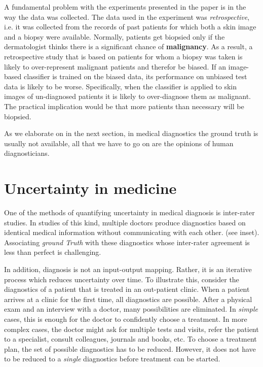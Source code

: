 \documentclass[11pt]{pnas-new}
\begin{document}
A fundamental problem with the experiments presented in the paper is in the way the data was
collected. The data used in the experiment was {\em retrospective},
i.e. it was collected from the records of past patients for which both
a skin image and a biopsy were available. Normally, patients get
biopsied only if the dermatologist thinks there is a significant
chance of {\bf malignancy}. As a result, a retrospective study that is
based on patients for whom a biopsy was taken is likely to
over-represent malignant patients and therefor be biased. If an image-based classifier
is trained on the biased data, its performance on unbiased test data
is likely to be worse. Specifically, when the classifier is applied to skin
images of un-diagnosed patients it is likely to over-diagnose them as
malignant. The practical implication would be that more patients than
necessary will be biopsied. 

As we elaborate on in the next section, in medical diagnostics the
ground truth is usually not available, all that we have to go on are
the opinions of human diagnosticians.

\section{Uncertainty in medicine}


One of the methods of quantifying uncertainty in medical diagnosis is inter-rater studies.
In studies of this kind, multiple doctors produce diagnostics
based on identical medical information without communicating with each other. (see inset).
Associating {\em ground Truth} with these diagnostics whose inter-rater agreement is less than perfect is challenging.
 
 

In addition, diagnosis is not an input-output mapping. Rather, it is
an iterative process which reduces uncertainty over time. To
illustrate this, consider the diagnostics of a patient that is treated
in an out-patient clinic.  When a patient arrives at a clinic for the
first time, all diagnostics are possible. After a physical exam and an
interview with a doctor, many possibilities are eliminated.
In {\em simple} cases, this is enough for
the doctor to confidently choose a treatment. In more complex cases,
the doctor might ask for multiple tests and visits, refer the patient
to a specialist, consult colleagues, journals and books, etc. To
choose a treatment plan, the set of possible diagnostics has to be
reduced.  However, it does not have to be reduced to a {\em single}
diagnostics before treatment can be started.
\end{document}
